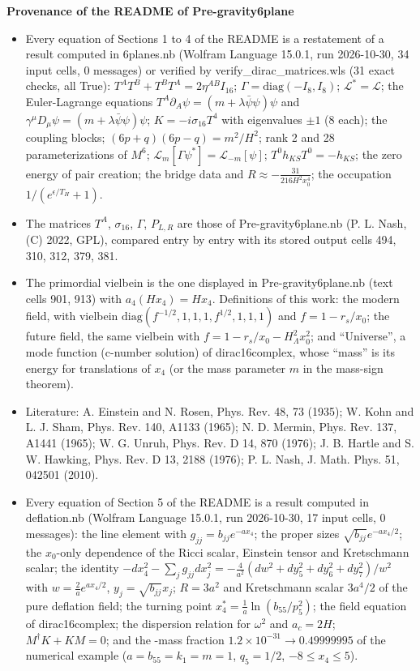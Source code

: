 \documentclass[10pt]{article}
\begin{document}
{\raggedright\LARGE\bfseries Provenance of the README of Pre-gravity6plane\par}\medskip

\begin{itemize}
\item Every equation of Sections 1 to 4 of the README is a restatement of a result computed in 6planes.nb (Wolfram Language 15.0.1, run 2026-10-30, 34 input cells, 0 messages) or verified by verify\_dirac\_matrices.wls (31 exact checks, all True): $T^AT^B+T^BT^A = 2\eta^{AB}I_{16}$; $\Gamma = \mathrm{diag}(-I_8,I_8)$; $\mathcal L^* = \mathcal L$; the Euler-Lagrange equations $T^A\partial_A\psi = (m+\lambda\bar\psi\psi)\psi$ and $\gamma^\mu D_\mu\psi = (m+\lambda\bar\psi\psi)\psi$; $K = -i\sigma_{16}T^4$ with eigenvalues $\pm1$ (8 each); the coupling blocks; $(6p+q)(6p-q) = m^2/H^2$; rank 2 and 28 parameterizations of $M^6$; $\mathcal L_m[\Gamma\psi^*] = \mathcal L_{-m}[\psi]$; $T^0h_{KS}T^0 = -h_{KS}$; the zero energy of pair creation; the bridge data and $R\approx-\frac{31}{216H^2x_0^4}$; the occupation $1/(e^{\epsilon/T_H}+1)$.
\item The matrices $T^A$, $\sigma_{16}$, $\Gamma$, $P_{L,R}$ are those of Pre-gravity6plane.nb (P. L. Nash, (C) 2022, GPL), compared entry by entry with its stored output cells 494, 310, 312, 379, 381.
\item The primordial vielbein is the one displayed in Pre-gravity6plane.nb (text cells 901, 913) with $a_4(Hx_4) = Hx_4$. Definitions of this work: the modern field, with vielbein $\mathrm{diag}(f^{-1/2},1,1,1,f^{1/2},1,1,1)$ and $f = 1-r_s/x_0$; the future field, the same vielbein with $f = 1-r_s/x_0-H_\Lambda^2x_0^2$; and ``Universe'', a mode function (c-number solution) of dirac16complex, whose ``mass'' is its energy for translations of $x_4$ (or the mass parameter $m$ in the mass-sign theorem).
\item Literature: A. Einstein and N. Rosen, Phys. Rev. 48, 73 (1935); W. Kohn and L. J. Sham, Phys. Rev. 140, A1133 (1965); N. D. Mermin, Phys. Rev. 137, A1441 (1965); W. G. Unruh, Phys. Rev. D 14, 870 (1976); J. B. Hartle and S. W. Hawking, Phys. Rev. D 13, 2188 (1976); P. L. Nash, J. Math. Phys. 51, 042501 (2010).
\item Every equation of Section 5 of the README is a result computed in deflation.nb (Wolfram Language 15.0.1, run 2026-10-30, 17 input cells, 0 messages): the line element with $g_{jj} = b_{jj}e^{-ax_4}$; the proper sizes $\sqrt{b_{jj}}e^{-ax_4/2}$; the $x_0$-only dependence of the Ricci scalar, Einstein tensor and Kretschmann scalar; the identity $-dx_4^2 - \sum_j g_{jj}dx_j^2 = -\frac{4}{a^2}(dw^2 + dy_5^2 + dy_6^2 + dy_7^2)/w^2$ with $w = \frac2ae^{ax_4/2}$, $y_j = \sqrt{b_{jj}}x_j$; $R = 3a^2$ and Kretschmann scalar $3a^4/2$ of the pure deflation field; the turning point $x_4^* = \frac1a\ln(b_{55}/p_5^2)$; the field equation of dirac16complex; the dispersion relation for $\omega^2$ and $a_c = 2H$; $M^\dagger K + KM = 0$; and the -mass fraction $1.2\times10^{-31} \to 0.49999995$ of the numerical example ($a = b_{55} = k_1 = m = 1$, $q_5 = 1/2$, $-8 \le x_4 \le 5$).

\end{itemize}
\end{document}
